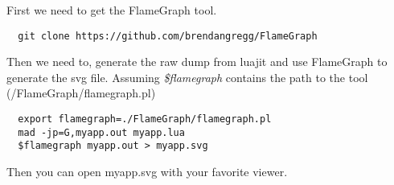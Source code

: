 First we need to get the FlameGraph \cite{flamegraph} tool.
\begin{center}
\begin{lstlisting}
  git clone https://github.com/brendangregg/FlameGraph
\end{lstlisting}
\end{center}
Then we need to, generate the raw dump from luajit and use FlameGraph to generate
the svg file. Assuming \emph{\$flamegraph} contains the path to the tool (/FlameGraph/flamegraph.pl)

\begin{center}
\begin{lstlisting}
  export flamegraph=./FlameGraph/flamegraph.pl
  mad -jp=G,myapp.out myapp.lua
  $flamegraph myapp.out > myapp.svg
\end{lstlisting}
\end{center}
Then you can open myapp.svg with your favorite viewer.
